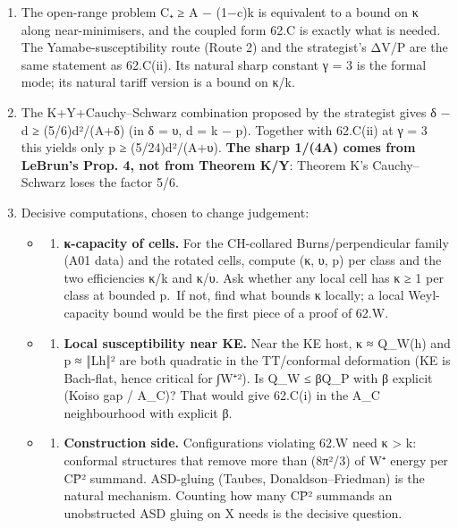 \documentclass[
  10pt,
]{report}
\providecommand{\tightlist}{%
  \setlength{\itemsep}{0pt}\setlength{\parskip}{0pt}}
\begin{document}
\begin{enumerate}
\def\labelenumi{\arabic{enumi}.}
\tightlist
\item
  The open-range problem C₊ ≥ A − (1−c)k is equivalent to a bound on κ
  along near-minimisers, and the coupled form 62.C is exactly what is
  needed. The Yamabe-susceptibility route (Route 2) and the strategist's
  ΔV/P are the same statement as 62.C(ii). Its natural sharp constant γ
  = 3 is the formal mode; its natural tariff version is a bound on κ/k.
\item
  The K+Y+Cauchy--Schwarz combination proposed by the strategist gives δ
  − d ≥ (5/6)d²/(A+δ) (in δ = υ, d = k − p). Together with 62.C(ii) at γ
  = 3 this yields only p ≥ (5/24)d²/(A+υ). \textbf{The sharp 1/(4A)
  comes from LeBrun's Prop. 4, not from Theorem K/Y}: Theorem K's
  Cauchy--Schwarz loses the factor 5/6.
\item
  Decisive computations, chosen to change judgement:

  \begin{itemize}
  \item
    \begin{enumerate}
    \def\labelenumii{(\alph{enumii})}
    \tightlist
    \item
      \textbf{κ-capacity of cells.} For the CH-collared
      Burns/perpendicular family (A01 data) and the rotated cells,
      compute (κ, υ, p) per class and the two efficiencies κ/k and κ/υ.
      Ask whether any local cell has κ ≥ 1 per class at bounded p.~If
      not, find what bounds κ locally; a local Weyl-capacity bound would
      be the first piece of a proof of 62.W.
    \end{enumerate}
  \item
    \begin{enumerate}
    \def\labelenumii{(\alph{enumii})}
    \setcounter{enumii}{1}
    \tightlist
    \item
      \textbf{Local susceptibility near KE.} Near the KE host, κ ≈
      Q\_W(h) and p ≈ ‖Lh‖² are both quadratic in the TT/conformal
      deformation (KE is Bach-flat, hence critical for
      ∫\textbar W⁺\textbar²). Is Q\_W ≤ βQ\_P with β explicit (Koiso gap
      / A\_C)? That would give 62.C(i) in the A\_C neighbourhood with
      explicit β.
    \end{enumerate}
  \item
    \begin{enumerate}
    \def\labelenumii{(\alph{enumii})}
    \setcounter{enumii}{2}
    \tightlist
    \item
      \textbf{Construction side.} Configurations violating 62.W need κ
      \textgreater{} k: conformal structures that remove more than
      (8π²/3) of W⁺ energy per CP̄² summand. ASD-gluing (Taubes,
      Donaldson--Friedman) is the natural mechanism. Counting how many
      CP̄² summands an unobstructed ASD gluing on X needs is the decisive
      question.
    \end{enumerate}
  \end{itemize}
\end{enumerate}
\end{document}
